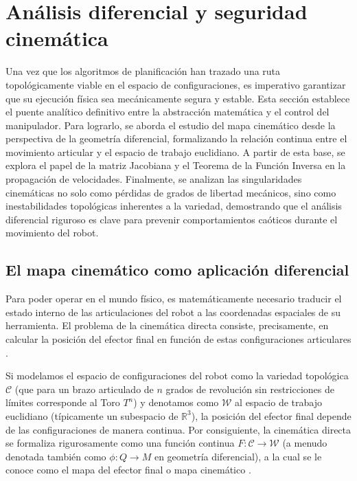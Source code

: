\section{Análisis diferencial y seguridad cinemática}

Una vez que los algoritmos de planificación han trazado una ruta topológicamente viable en el 
espacio de configuraciones, es imperativo garantizar que su ejecución física sea mecánicamente segura 
y estable. Esta sección establece el puente analítico definitivo entre la abstracción matemática y el 
control del manipulador. Para lograrlo, se aborda el estudio del mapa cinemático desde la perspectiva 
de la geometría diferencial, formalizando la relación continua entre el movimiento articular y el 
espacio de trabajo euclidiano. A partir de esta base, se explora el papel de la matriz Jacobiana y 
el Teorema de la Función Inversa en la propagación de velocidades. Finalmente, se analizan las 
singularidades cinemáticas no solo como pérdidas de grados de libertad mecánicos, sino como 
inestabilidades topológicas inherentes a la variedad, demostrando que el análisis diferencial riguroso 
es clave para prevenir comportamientos caóticos durante el movimiento del robot.


\subsection{El mapa cinemático como aplicación diferencial}

Para poder operar en el mundo físico, es matemáticamente necesario traducir el estado interno 
de las articulaciones del robot a las coordenadas espaciales de su herramienta. El problema 
de la cinemática directa consiste, precisamente, en calcular la posición del efector final en 
función de estas configuraciones articulares \parencite{grant2015topology}. 

Si modelamos el espacio de configuraciones del robot como la variedad 
topológica $\mathcal{C}$ (que para un brazo articulado de $n$ grados de revolución sin 
restricciones de límites corresponde al Toro $T^n$) y denotamos como $\mathcal{W}$ al 
espacio de trabajo euclidiano (típicamente un subespacio de $\mathbb{R}^3$), la posición del 
efector final depende de las configuraciones de manera continua. Por consiguiente, 
la cinemática directa se formaliza rigurosamente como una función continua 
$F: \mathcal{C} \to \mathcal{W}$ (a menudo denotada también como $\phi: Q \to M$ en geometría 
diferencial), a la cual se le conoce como el mapa del efector final o mapa cinemático \parencite{grant2015topology}.


